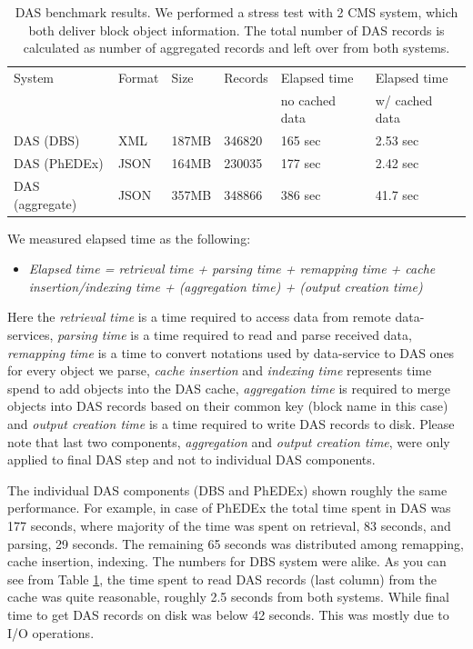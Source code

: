 \documentclass[a4paper]{jpconf}
\begin{document}
\begin{table}[hbt]
\centering
\begin{tabular}{llllll}\hline
\hline

System & Format & Size & Records & Elapsed time & Elapsed time \\
& & & & no cached data & w/ cached data \\
\hline
DAS (DBS) & XML & 187MB & 346820 & 165 sec & 2.53 sec \\
DAS (PhEDEx) & JSON & 164MB & 230035 & 177 sec & 2.42 sec \\
DAS (aggregate) & JSON & 357MB & 348866 & 386 sec & 41.7 sec \\
\hline
\hline
\end{tabular}
\caption{DAS benchmark results. We performed a stress test with 2 CMS system, which
both deliver block object information. The total number of DAS records is calculated
as number of aggregated records and left over from both systems.}
\label{DAS_benchmark}
\end{table}

We measured elapsed time as the following:
\begin{itemize}
\item[]
{\it
Elapsed time = retrieval time + parsing time + remapping time 
        + cache insertion/indexing time 
        + (aggregation time) + (output creation time)
}
\end{itemize}
Here the {\it retrieval time} is a time required to access data from remote data-services,
{\it parsing time} is a time required to read and parse received data, {\it remapping time}
is a time to convert notations used by data-service to DAS ones for every object
we parse, {\it cache insertion} and {\it indexing time} represents time spend to add objects into
the DAS cache, {\it aggregation time} is required to merge objects into DAS records based
on their common key (block name in this case) and {\it output creation time}
is a time required to write DAS records to disk. Please note that last two
components, {\it aggregation} and {\it output creation time}, were only applied to
final DAS step and not to individual DAS components.

The individual DAS components (DBS and PhEDEx) shown roughly the same performance.
For example, in case of PhEDEx the total time spent in DAS was 177 seconds, where
majority of the time was spent on retrieval, 83 seconds, and parsing, 29 seconds.
The remaining 65 seconds was distributed among remapping, cache insertion, indexing. The
numbers for DBS system were alike. As you can see from Table \ref{DAS_benchmark},
the time spent to read DAS records (last column) from the cache was quite
reasonable, roughly 2.5 seconds from both systems. While final time to
get DAS records on disk was below 42 seconds. This was mostly due to I/O operations.
\end{document}
